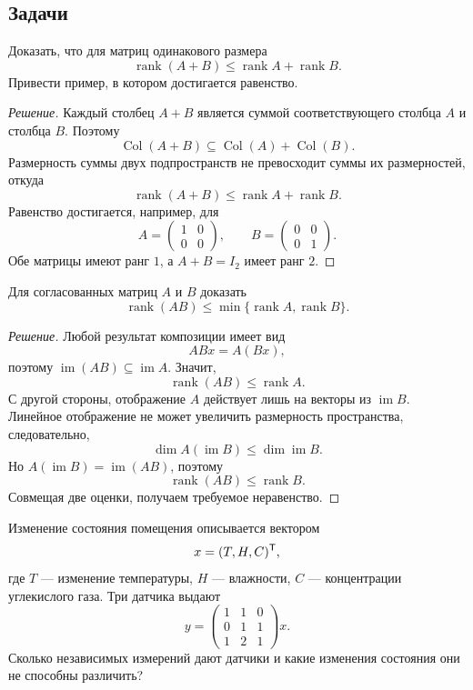 \subsection*{Задачи}

\begin{problem}
Доказать, что для матриц одинакового размера
\[
\operatorname{rank}(A+B)
\leq
\operatorname{rank}A+
\operatorname{rank}B.
\]
Привести пример, в котором достигается равенство.
\end{problem}

\begin{proof}[Решение]
Каждый столбец \(A+B\) является суммой соответствующего столбца \(A\) и столбца \(B\). Поэтому
\[
\operatorname{Col}(A+B)
\subseteq
\operatorname{Col}(A)+\operatorname{Col}(B).
\]
Размерность суммы двух подпространств не превосходит суммы их размерностей, откуда
\[
\operatorname{rank}(A+B)
\leq
\operatorname{rank}A+
\operatorname{rank}B.
\]
Равенство достигается, например, для
\[
A=
\begin{pmatrix}1&0\\0&0\end{pmatrix},
\qquad
B=
\begin{pmatrix}0&0\\0&1\end{pmatrix}.
\]
Обе матрицы имеют ранг \(1\), а \(A+B=I_2\) имеет ранг \(2\).
\end{proof}

\begin{problem}
Для согласованных матриц \(A\) и \(B\) доказать
\[
\operatorname{rank}(AB)
\leq
\min\{\operatorname{rank}A,\operatorname{rank}B\}.
\]
\end{problem}

\begin{proof}[Решение]
Любой результат композиции имеет вид
\[
ABx=A(Bx),
\]
поэтому \(\operatorname{im}(AB)\subseteq\operatorname{im}A\). Значит,
\[
\operatorname{rank}(AB)\leq\operatorname{rank}A.
\]
С другой стороны, отображение \(A\) действует лишь на векторы из \(\operatorname{im}B\). Линейное отображение не может увеличить размерность пространства, следовательно,
\[
\dim A(\operatorname{im}B)
\leq
\dim\operatorname{im}B.
\]
Но \(A(\operatorname{im}B)=\operatorname{im}(AB)\), поэтому
\[
\operatorname{rank}(AB)
\leq
\operatorname{rank}B.
\]
Совмещая две оценки, получаем требуемое неравенство.
\end{proof}

\begin{problem}
Изменение состояния помещения описывается вектором
\[
x=(T,H,C)^{\mathsf{T}},
\]
где \(T\) --- изменение температуры, \(H\) --- влажности, \(C\) --- концентрации углекислого газа. Три датчика выдают
\[
y=
\begin{pmatrix}
1&1&0\\
0&1&1\\
1&2&1
\end{pmatrix}x.
\]
Сколько независимых измерений дают датчики и какие изменения состояния они не способны различить?
\end{problem}

